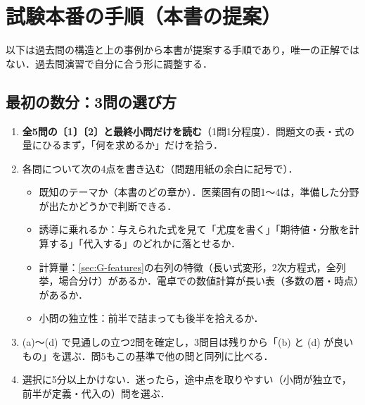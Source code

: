 \section{試験本番の手順（本書の提案）}\label{sec:G-plan}
以下は過去問の構造と上の事例から本書が提案する手順であり，唯一の正解ではない．過去問演習で自分に合う形に調整する．

\subsection{最初の数分：3問の選び方}
\begin{enumerate}
\item \textbf{全5問の〔1〕〔2〕と最終小問だけを読む}（1問1分程度）．問題文の表・式の量にひるまず，「何を求めるか」だけを拾う．
\item 各問について次の4点を書き込む（問題用紙の余白に記号で）．
  \begin{itemize}
  \item[(a)] 既知のテーマか（本書のどの章か）．医薬固有の問1〜4は，準備した分野が出たかどうかで判断できる．
  \item[(b)] 誘導に乗れるか：与えられた式を見て「尤度を書く」「期待値・分散を計算する」「代入する」のどれかに落とせるか．
  \item[(c)] 計算量：\cref{sec:G-features}の右列の特徴（長い式変形，2次方程式，全列挙，場合分け）があるか．電卓での数値計算が長い表（多数の層・時点）があるか．
  \item[(d)] 小問の独立性：前半で詰まっても後半を拾えるか．
  \end{itemize}
\item (a)〜(d) で見通しの立つ2問を確定し，3問目は残りから「(b) と (d) が良いもの」を選ぶ．問5もこの基準で他の問と同列に比べる．
\item 選択に5分以上かけない．迷ったら，途中点を取りやすい（小問が独立で，前半が定義・代入の）問を選ぶ．
\end{enumerate}

